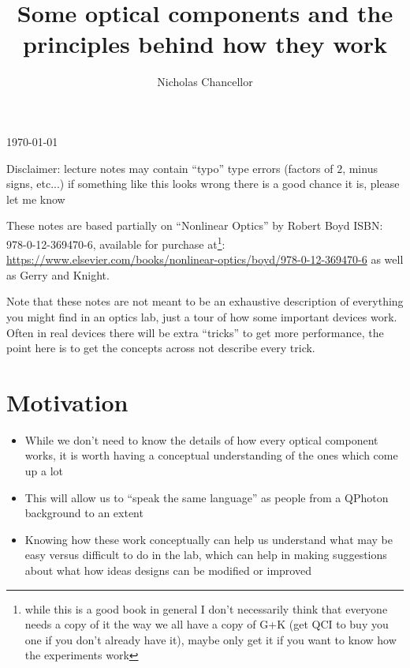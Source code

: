 \documentclass[english]{article}
\begin{document}
\title{Some optical components and the principles behind how they work}
\author{Nicholas Chancellor}


\maketitle


\today %


{\small Disclaimer: lecture notes may contain ``typo'' type errors (factors of $2$, minus signs, etc...) if something like this looks wrong there is a good chance it is, please let me know}

These notes are based partially on ``Nonlinear Optics'' by Robert Boyd ISBN: 978-0-12-369470-6, available for purchase at\footnote{while this is a good book in general I don't necessarily think that everyone needs a copy of  it the way we all have a copy of G+K (get QCI to buy you one if you don't already have it), maybe only get it if you want to know how the experiments work}:\\ \href{https://www.elsevier.com/books/nonlinear-optics/boyd/978-0-12-369470-6}{https://www.elsevier.com/books/nonlinear-optics/boyd/978-0-12-369470-6} as well as Gerry and Knight. 

Note that these notes are not meant to be an exhaustive description of everything you might find in an optics lab, just a tour of how some important devices work. Often in real devices there will be extra ``tricks'' to get more performance, the point here is to get the concepts across not describe every trick.


\section{Motivation}
\begin{itemize}
\item While we don't need to know the details of how every optical component works, it is worth having a conceptual understanding of the ones which come up a lot
\item  This will allow us to ``speak the same language'' as people from a QPhoton background to an extent
\item Knowing how these work conceptually can help us understand what may be easy versus difficult to do in the lab, which can help in making suggestions about what how ideas designs can be modified or improved
\end{itemize}
\end{document}
